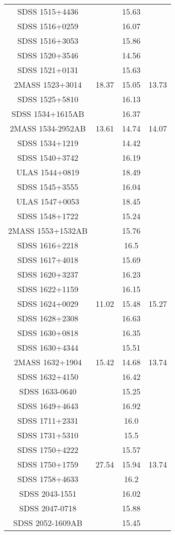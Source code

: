 \begin{table}
\begin{tabular}{cccc}
SDSS 1515+4436 &  & 15.63 &  \\
SDSS 1516+0259 &  & 16.07 &  \\
SDSS 1516+3053 &  & 15.86 &  \\
SDSS 1520+3546 &  & 14.56 &  \\
SDSS 1521+0131 &  & 15.63 &  \\
2MASS 1523+3014 & 18.37 & 15.05 & 13.73 \\
SDSS 1525+5810 &  & 16.13 &  \\
SDSS 1534+1615AB &  & 16.37 &  \\
2MASS 1534-2952AB & 13.61 & 14.74 & 14.07 \\
SDSS 1534+1219 &  & 14.42 &  \\
SDSS 1540+3742 &  & 16.19 &  \\
ULAS 1544+0819 &  & 18.49 &  \\
SDSS 1545+3555 &  & 16.04 &  \\
ULAS 1547+0053 &  & 18.45 &  \\
SDSS 1548+1722 &  & 15.24 &  \\
2MASS 1553+1532AB &  & 15.76 &  \\
SDSS 1616+2218 &  & 16.5 &  \\
SDSS 1617+4018 &  & 15.69 &  \\
SDSS 1620+3237 &  & 16.23 &  \\
SDSS 1622+1159 &  & 16.15 &  \\
SDSS 1624+0029 & 11.02 & 15.48 & 15.27 \\
SDSS 1628+2308 &  & 16.63 &  \\
SDSS 1630+0818 &  & 16.35 &  \\
SDSS 1630+4344 &  & 15.51 &  \\
2MASS 1632+1904 & 15.42 & 14.68 & 13.74 \\
SDSS 1632+4150 &  & 16.42 &  \\
SDSS 1633-0640 &  & 15.25 &  \\
SDSS 1649+4643 &  & 16.92 &  \\
SDSS 1711+2331 &  & 16.0 &  \\
SDSS 1731+5310 &  & 15.5 &  \\
SDSS 1750+4222 &  & 15.57 &  \\
SDSS 1750+1759 & 27.54 & 15.94 & 13.74 \\
SDSS 1758+4633 &  & 16.2 &  \\
SDSS 2043-1551 &  & 16.02 &  \\
SDSS 2047-0718 &  & 15.88 &  \\
SDSS 2052-1609AB &  & 15.45 &  \\

\end{tabular}
\end{table}
